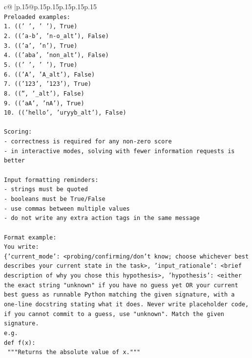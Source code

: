 \documentclass{article}
\begin{document}
{\begin{supertabular}{c@{$\;$}|p{.15\linewidth}@{}p{.15\linewidth}p{.15\linewidth}p{.15\linewidth}p{.15\linewidth}p{.15\linewidth}}
{{{\\ 
\texttt{Preloaded examples:} \\
\texttt{1. (('   ', '   '), True)} \\
\texttt{2. (('a{-}b', 'n{-}o\_alt'), False)} \\
\texttt{3. (('a', 'n'), True)} \\
\texttt{4. (('aba', 'non\_alt'), False)} \\
\texttt{5. ((' ', ' '), True)} \\
\texttt{6. (('A', 'A\_alt'), False)} \\
\texttt{7. (('123', '123'), True)} \\
\texttt{8. (('', '\_alt'), False)} \\
\texttt{9. (('aA', 'nA'), True)} \\
\texttt{10. (('hello', 'uryyb\_alt'), False)} \\
\\ 
\texttt{Scoring:} \\
\texttt{{-} correctness is required for any non{-}zero score} \\
\texttt{{-} in interactive modes, solving with fewer information requests is better} \\
\\ 
\texttt{Input formatting reminders:} \\
\texttt{{-} strings must be quoted} \\
\texttt{{-} booleans must be True/False} \\
\texttt{{-} use commas between multiple values} \\
\texttt{{-} do not write any extra action tags in the same message} \\
\\ 
\texttt{Format example:} \\
\texttt{You write:} \\
\texttt{\{'current\_mode': <probing/confirming/don't know; choose whichever best describes your current state in the task>, 'input\_rationale': <brief description of why you chose this hypothesis>, 'hypothesis': <either the exact string "unknown" if you have no guess yet OR your current best guess as runnable Python matching the given signature, with a one{-}line docstring stating what it does. Never write placeholder code, if you cannot commit to a guess, use "unknown". Match the given signature.} \\
\texttt{e.g.} \\
\texttt{def f(x):} \\
\texttt{	"""Returns the absolute value of x."""} \\
}}}
\end{supertabular}}
\end{document}
